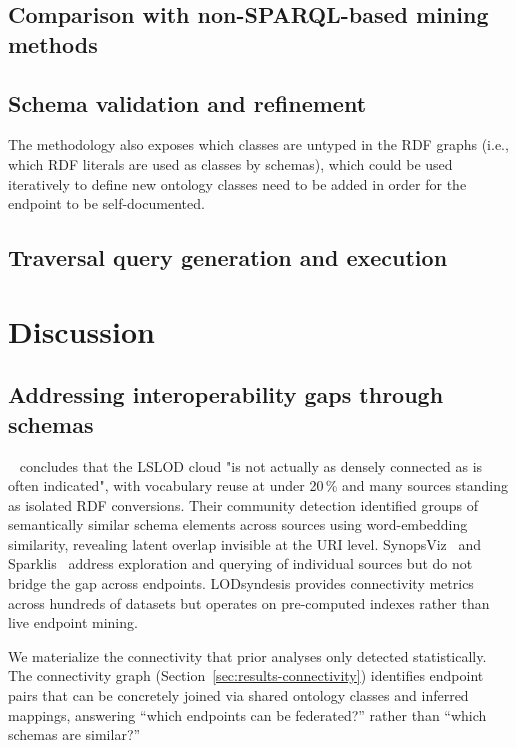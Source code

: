\documentclass[12pt]{article}
\begin{document}
\subsection{Comparison with non-SPARQL-based mining methods}


\subsection{Schema validation and refinement}
\label{sec:results-validation}


The methodology also exposes which classes are untyped in the RDF graphs (i.e., which RDF literals are used as classes by schemas), which
could be used iteratively to define new ontology classes need to be added in order for the endpoint to be self-documented.

\subsection{Traversal query generation and execution}

\section{Discussion}

\subsection{Addressing interoperability gaps through schemas}

~\cite{kamdar_empirical_2021} concludes that the LSLOD
cloud "is not actually as densely connected as is often indicated",
with vocabulary reuse at under 20\,\% and many sources standing as
isolated RDF conversions.
Their community detection identified groups of semantically similar
schema elements across sources using word-embedding similarity,
revealing latent overlap invisible at the URI level. %
SynopsViz~\cite{bikakis_rdfsynopsviz_2014} and Sparklis~\cite{ferre_sparklis_2016} address
exploration and querying of individual sources but do not bridge the
gap across endpoints.
LODsyndesis provides connectivity metrics across hundreds of datasets
but operates on pre-computed indexes rather than live endpoint
mining.

We materialize the connectivity that prior analyses only
detected statistically.
The connectivity graph (Section~\ref{sec:results-connectivity}) identifies endpoint pairs
that can be concretely joined via shared ontology classes and inferred
mappings, answering ``which endpoints can be federated?'' rather than ``which schemas are similar?''
\end{document}
